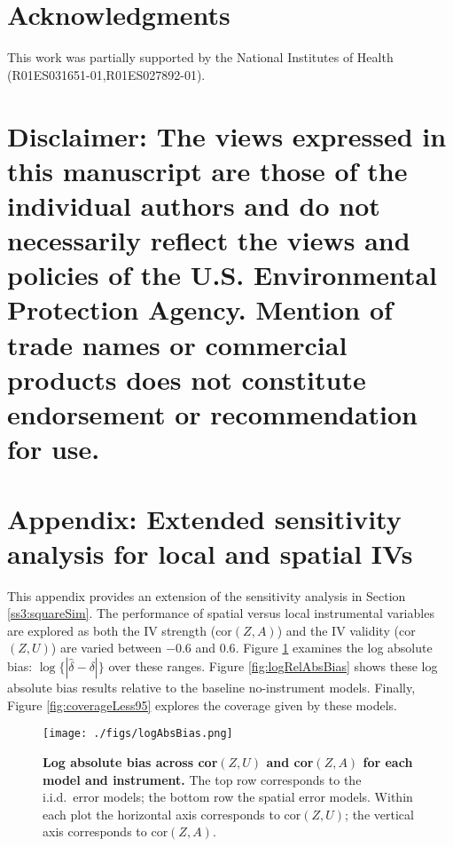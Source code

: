 \documentclass[12pt]{article}
\begin{document}

%
% 
 

\section*{Acknowledgments}
This work was partially supported by the National Institutes of Health (R01ES031651-01,R01ES027892-01).

\section*{Disclaimer: The views expressed in this manuscript are those of the individual authors and do not necessarily reflect the views and policies of the U.S. Environmental Protection Agency. Mention of trade names or commercial products does not constitute endorsement or recommendation for use.}
\newpage
\section*{Appendix:  Extended sensitivity analysis for local and spatial IVs}\label{extendedSensitivityAppendix}

This appendix provides an extension of the sensitivity analysis in Section \ref{ss3:squareSim}. The performance of spatial versus local instrumental variables are explored as both the IV strength (cor$(Z,A)$) and the IV validity (cor$(Z,U)$) are varied between $-0.6$ and $0.6$. 
Figure \ref{fig:logAbsBias} examines the log absolute bias: $\log\{ |\hat{\delta} - \delta| \}$ over these ranges. 
Figure \ref{fig:logRelAbsBias} shows these log absolute bias results relative to the baseline no-instrument models. 
Finally, Figure \ref{fig:coverageLess95} explores the coverage given by these models. 


\begin{figure}[h]
    \centering
    \texttt{[image: ./figs/logAbsBias.png]}
    \caption{\textbf{Log absolute bias across cor$(Z,U)$ and cor$(Z,A)$ for each model and instrument.} The top row corresponds to the i.i.d.~error models; the bottom row the spatial error models. Within each plot the horizontal axis corresponds to cor$(Z,U)$; the vertical axis corresponds to cor$(Z,A)$.}
    \label{fig:logAbsBias}
\end{figure}
\end{document}
